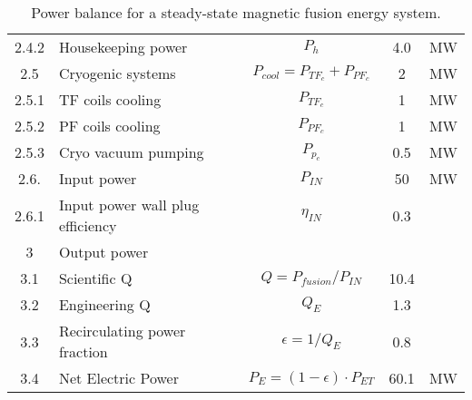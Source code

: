 \begin{table}[ht!]
\begin{tabular}{|c|p{5cm}|c|c|c|}
2.4.2	&	Housekeeping power	&	$P_{{h}}$	&	4.0	&	MW \\
2.5	&	Cryogenic systems	&	$P_{{cool}} = P_{{TF}_c} + P_{{PF}_c}$	&	2	&	MW \\
2.5.1	&	TF coils cooling	&	$P_{{TF}_c}$	&	1	&	MW \\
2.5.2	&	PF coils cooling	&	$P_{{PF}_c}$	&	1	&	MW \\
2.5.3	&	Cryo vacuum pumping	&	$P_{{p}_c}$	&	0.5	&	MW \\
2.6.	& Input power 	& $P_{IN}$	&	50	&	MW \\
2.6.1	& Input power wall plug efficiency  &	$\eta_{IN}$ & 0.3	&	 \\
\hline								
3	&	Output power	&		&		&	\\
\hline
3.1	&	Scientific Q	&	$Q = P_{{fusion}}/P_{{IN}}$	&	10.4	&	\\
3.2	&	Engineering Q	&	$Q_{{E}}$	&	1.3	&	\\
3.3	&	Recirculating power fraction	&	$\epsilon = 1/Q_{{E}}$	&	0.8	&	\\
3.4	&	Net Electric Power	&	$P_{{E}} = (1 - \epsilon) \cdot P_{{ET}}$	&	60.1	&	MW \\
\hline								
\end{tabular}	
\caption{Power balance for a steady-state magnetic fusion energy system.}
\label{tab:powerbalance}
\end{table}





